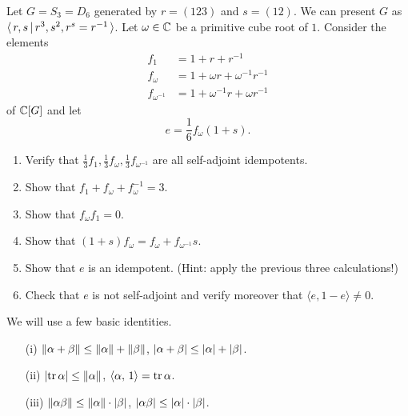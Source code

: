 \begin{exercise}
    Let $G = S_3 = D_6$ generated by $r = (1 2 3)$ and $s = (1 2)$.
    We can present $G$ as $\langle \, r, s \, | \, r^3, s^2, r^s = r^{-1} \, \rangle$.
    Let $\omega \in \mathbb{C}$ be a primitive cube root of $1$.
    Consider the elements
    \begin{align*}
        f_1 &= 1 + r + r^{-1} \\
        f_\omega &= 1 + \omega r + \omega^{-1} r^{-1} \\
        f_{\omega^{-1}} &= 1 + \omega^{-1} r + \omega r^{-1}
    \end{align*}
    of $\mathbb{C}[G]$ and let \[
        e = \frac{1}{6} f_\omega (1 + s).
    \]
    \begin{enumerate}
        \item Verify that $\frac{1}{3} f_1, \frac{1}{3} f_\omega, \frac{1}{3} f_{\omega^{-1}}$ are all self-adjoint idempotents.
        \item Show that $f_1 + f_\omega + f_\omega^{-1} = 3$.
        \item Show that $f_\omega f_1 = 0$.
        \item Show that $(1 + s) f_\omega = f_\omega + f_{\omega^{-1}} s$.
        \item Show that $e$ is an idempotent. (Hint: apply the previous three calculations!)
        \item Check that $e$ is not self-adjoint and verify moreover that $\langle e, 1 - e \rangle \neq 0$.
    \end{enumerate}
\end{exercise}

We will use a few basic identities.
\begin{lemma}
    \begin{enumerate}
        \item[(i)] $\left\lVert \alpha + \beta \right\rVert \leq \left\lVert \alpha \right\rVert + \left\lVert \beta \right\rVert$, $\lvert \alpha + \beta \rvert \leq \lvert \alpha \rvert + \lvert \beta \rvert$.
        \item[(ii)] $\lvert \operatorname{tr} \alpha \rvert \leq \left\lVert \alpha \right\rVert$, $\langle \alpha, \, 1 \rangle = \operatorname{tr} \alpha$.
        \item[(iii)] $\left\lVert \alpha \beta \right\rVert \leq \left\lVert \alpha \right\rVert \cdot \lvert \beta \rvert$, $\lvert \alpha \beta \rvert \leq \lvert \alpha \rvert \cdot \lvert \beta \rvert$.
    \end{enumerate}
\end{lemma}

